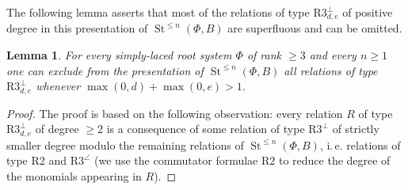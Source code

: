 \documentclass[10pt,a4paper,twoside]{article}
\newtheorem{lemma}{Lemma}
\theoremstyle{remark}
\theoremstyle{definition}
\numberwithin{lemma}{section}
\numberwithin{prop}{section}
\numberwithin{corollary}{section}
\numberwithin{externaltheorem}{section}
\DeclareMathOperator{\St}{St}
\numberwithin{equation}{section}
\begin{document}
The following lemma asserts that most of the relations of type $\text{R3}^\bot_{d,e}$ of positive degree in this presentation of $\St^{\leq n}(\Phi, B)$ 
 are superfluous and can be omitted.
\begin{lemma}\label{superfluous-relations}
 For every simply-laced root system $\Phi$ of rank $\geq 3$ and every $n \geq 1$ one can exclude from
 the presentation of $\St^{\leq n}(\Phi, B)$ all relations of type $\text{R3}_{d,e}^\bot$ whenever $\max(0,d) + \max(0,e) > 1$.
\end{lemma}
\begin{proof}
The proof is based on the following observation: every relation $R$ of type $\text{R3}^\bot_{d,e}$ of degree $\geq 2$ is a consequence of some relation of type $\text{R3}^\bot$ of strictly smaller degree modulo the remaining relations of $\St^{\leq n}(\Phi, B)$, i.\,e. relations of type R2 and $\text{R3}^{\angle}$ (we use the commutator formulae $\text{R2}$ to reduce the degree of the monomials appearing in $R$).
 

\end{proof}
\end{document}
